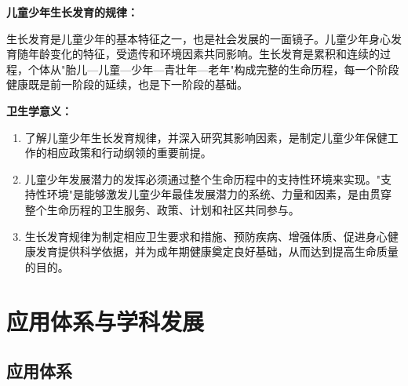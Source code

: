 \begin{keybox}
\textbf{儿童少年生长发育的规律：}

生长发育是儿童少年的基本特征之一，也是社会发展的一面镜子。儿童少年身心发育随年龄变化的特征，受遗传和环境因素共同影响。生长发育是累积和连续的过程，个体从"胎儿—儿童—少年—青壮年—老年"构成完整的生命历程，每一个阶段健康既是前一阶段的延续，也是下一阶段的基础。

\textbf{卫生学意义：}

\begin{enumerate}[leftmargin=*]
    \item 了解儿童少年生长发育规律，并深入研究其影响因素，是制定儿童少年保健工作的相应政策和行动纲领的重要前提。
    \item 儿童少年发展潜力的发挥必须通过整个生命历程中的支持性环境来实现。"支持性环境"是能够激发儿童少年最佳发展潜力的系统、力量和因素，是由贯穿整个生命历程的卫生服务、政策、计划和社区共同参与。
    \item 生长发育规律为制定相应卫生要求和措施、预防疾病、增强体质、促进身心健康发育提供科学依据，并为成年期健康奠定良好基础，从而达到提高生命质量的目的。
\end{enumerate}
\end{keybox}

\section{应用体系与学科发展}

\subsection{应用体系}

